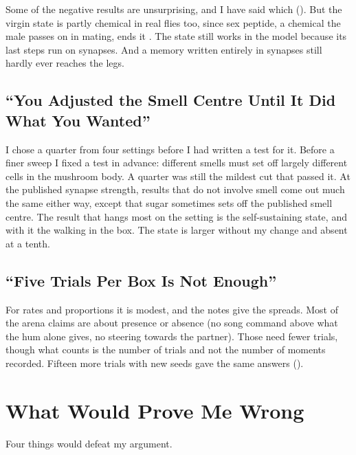 \documentclass[11pt,a4paper]{article}
\begin{document}
Some of the negative results are unsurprising, and I have said which (). But the virgin state is partly chemical in real flies too, since sex peptide, a chemical the male passes on in mating, ends it \citep{feng2014ascending}. The state still works in the model because its last steps run on synapses. And a memory written entirely in synapses still hardly ever reaches the legs.

\subsection{``You Adjusted the Smell Centre Until It Did What You Wanted''}

I chose a quarter from four settings before I had written a test for it. Before a finer sweep I fixed a test in advance: different smells must set off largely different cells in the mushroom body. A quarter was still the mildest cut that passed it. At the published synapse strength, results that do not involve smell come out much the same either way, except that sugar sometimes sets off the published smell centre. The result that hangs most on the setting is the self-sustaining state, and with it the walking in the box. The state is larger without my change and absent at a tenth.

\subsection{``Five Trials Per Box Is Not Enough''}

For rates and proportions it is modest, and the notes give the spreads. Most of the arena claims are about presence or absence (no song command above what the hum alone gives, no steering towards the partner). Those need fewer trials, though what counts is the number of trials and not the number of moments recorded. Fifteen more trials with new seeds gave the same answers ().

\section{What Would Prove Me Wrong}
\label{sec:refutation}

Four things would defeat my argument.
\end{document}

